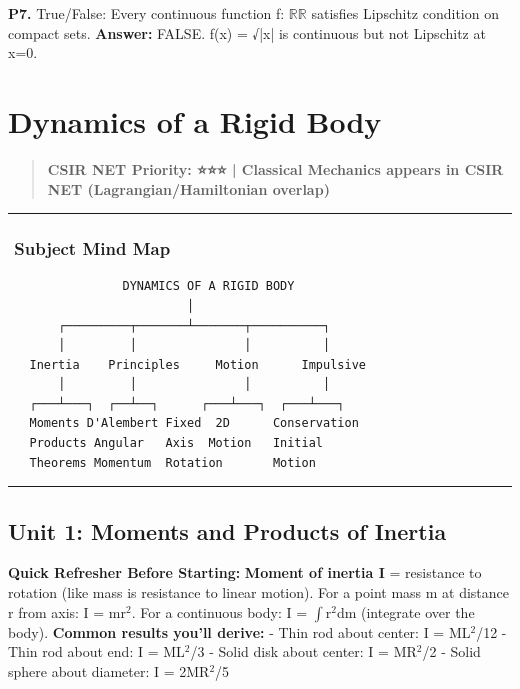 \documentclass[12pt,a4paper,openany]{book}
\begin{document}
{{\textbf{P7.} True/False: Every continuous function f: $\mathbb{R}\mathbb{R}$ satisfies Lipschitz condition on compact sets.
\textbf{Answer:} FALSE. f(x) = √|x| is continuous but not Lipschitz at x=0.

\newpage

\chapter{Dynamics of a Rigid Body}


\begin{quote}
\textbf{CSIR NET Priority: ⭐⭐⭐ | Classical Mechanics appears in CSIR NET (Lagrangian/Hamiltonian overlap)}
\end{quote}

\bigskip\noindent\rule{\textwidth}{0.4pt}\bigskip

\subsection{️ Subject Mind Map}

\begin{verbatim}
                DYNAMICS OF A RIGID BODY
                         │
       ┌─────────┬───────┴───────┬──────────┐
       │         │               │          │
   Inertia    Principles     Motion      Impulsive
       │         │               │          │
   ┌───┴───┐  ┌──┴──┐      ┌───┴───┐  ┌───┴───┐
   Moments D'Alembert Fixed  2D      Conservation
   Products Angular   Axis  Motion   Initial
   Theorems Momentum  Rotation       Motion
\end{verbatim}

\bigskip\noindent\rule{\textwidth}{0.4pt}\bigskip

\section{Unit 1: Moments and Products of Inertia}

\begin{prereqbox}
 \textbf{Quick Refresher Before Starting:}
\textbf{Moment of inertia I} = resistance to rotation (like mass is resistance to linear motion).
For a point mass m at distance r from axis: I = mr$^2$.
For a continuous body: I = $\int$r$^2$dm (integrate over the body).
\textbf{Common results you'll derive:}
- Thin rod about center: I = ML$^2$/12
- Thin rod about end: I = ML$^2$/3
- Solid disk about center: I = MR$^2$/2
- Solid sphere about diameter: I = 2MR$^2$/5
\end{prereqbox}



}}
\end{document}
